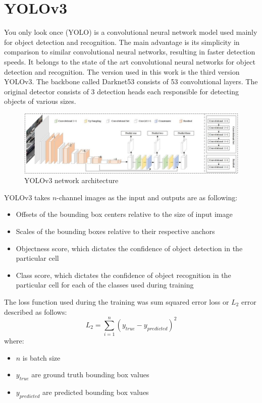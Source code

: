 \documentclass[twoside]{ctuthesis}
\theoremstyle{plain}
\theoremstyle{definition}
\theoremstyle{note}
\begin{document}
\section{YOLOv3}
You only look once (YOLO) is a convolutional neural network model used mainly for object detection and recognition. The main advantage is its simplicity in comparison to similar convolutional neural networks, resulting in faster detection speeds. It belongs to the state of the art convolutional neural networks for object detection and recognition. The version used in this work is the third version YOLOv3. The backbone called Darknet53 consists of 53 convolutional layers. The original detector consists of 3 detection heads each responsible for detecting objects of various sizes.
\begin{figure}[h]
	\caption{YOLOv3 network architecture}
	\centering
	\includegraphics[width=\textwidth]{yolov3model.jpg}
\end{figure}
YOLOv3 takes $n$-channel images as the input and outputs are as following:
\begin{itemize}
	\item Offsets of the bounding box centers relative to the size of input image
	\item Scales of the bounding boxes relative to their respective anchors
	\item Objectness score, which dictates the confidence of object detection in the particular cell
	\item Class score, which dictates the confidence of object recognition in the particular cell for each of the classes used during training
\end{itemize}
The loss function used during the training was sum squared error loss or $L_2$ error described as follows:
\begin{equation}
	L_2=\sum_{i=1}^{n}(y_{true}-y_{predicted})^2
\end{equation}
where:
\begin{itemize}
	\item $n$ is batch size
	\item $y_{true}$ are ground truth bounding box values
	\item $y_{predicted}$ are predicted bounding box values
\end{itemize}
\end{document}
